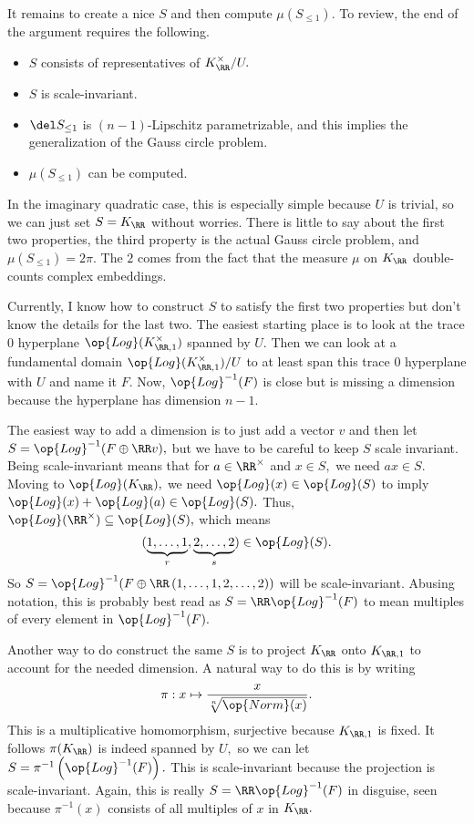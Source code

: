 It remains to create a nice $S$ and then compute $\mu(S_{\le1}).$ To review, the end of the argument requires the following.
\begin{itemize}
    \item $S$ consists of representatives of $K_\RR^\times/U.$
    \item $S$ is scale-invariant.
    \item $\del S_{\le1}$ is $(n-1)$-Lipschitz parametrizable, and this implies the generalization of the Gauss circle problem.
    \item $\mu(S_{\le1})$ can be computed.
\end{itemize}
In the imaginary quadratic case, this is especially simple because $U$ is trivial, so we can just set $S=K_\RR$ without worries. There is little to say about the first two properties, the third property is the actual Gauss circle problem, and $\mu(S_{\le1})=2\pi.$ The $2$ comes from the fact that the measure $\mu$ on $K_\RR$ double-counts complex embeddings.

Currently, I know how to construct $S$ to satisfy the first two properties but don't know the details for the last two. The easiest starting place is to look at the trace $0$ hyperplane $\op{Log}(K_{\RR,1}^\times)$ spanned by $U.$ Then we can look at a fundamental domain $\op{Log}(K_{\RR,1}^\times)/U$ to at least span this trace $0$ hyperplane with $U$ and name it $F.$ Now, $\op{Log}^{-1}(F)$ is close but is missing a dimension because the hyperplane has dimension $n-1.$

The easiest way to add a dimension is to just add a vector $v$ and then let $S=\op{Log}^{-1}(F\oplus\RR v),$ but we have to be careful to keep $S$ scale invariant. Being scale-invariant means that for $a\in\RR^\times$ and $x\in S,$ we need $ax\in S.$ Moving to $\op{Log}(K_\RR),$ we need $\op{Log}(x)\in\op{Log}(S)$ to imply $\op{Log}(x)+\op{Log}(a)\in\op{Log}(S).$ Thus, $\op{Log}(\RR^\times)\subseteq\op{Log}(S),$ which means
\[(\underbrace{1,\ldots,1}_r,\underbrace{2,\ldots,2}_s)\in\op{Log}(S).\]
So $S=\op{Log}^{-1}(F\oplus\RR\left(1,\ldots,1,2,\ldots,2\right))$ will be scale-invariant. Abusing notation, this is probably best read as $S=\RR\op{Log}^{-1}(F)$ to mean multiples of every element in $\op{Log}^{-1}(F).$

Another way to do construct the same $S$ is to project $K_\RR$ onto $K_{\RR,1}$ to account for the needed dimension. A natural way to do this is by writing
\[\pi:x\mapsto\frac x{\sqrt[n]{\op{Norm}(x)}}.\]
This is a multiplicative homomorphism, surjective because $K_{\RR,1}$ is fixed. It follows $\pi(K_\RR)$ is indeed spanned by $U,$ so we can let $S=\pi^{-1}\left(\op{Log}^{-1}(F)\right).$ This is scale-invariant because the projection is scale-invariant. Again, this is really $S=\RR\op{Log}^{-1}(F)$ in disguise, seen because $\pi^{-1}(x)$ consists of all multiples of $x$ in $K_\RR.$

